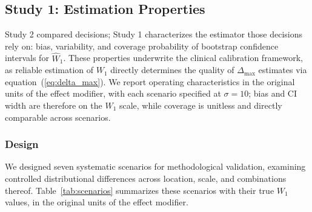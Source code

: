 \documentclass[AMA,Times1COL]{WileyNJDv5}
\begin{document}

\subsection{Study 1: Estimation Properties}\label{sec:study1}

Study 2 compared decisions; Study 1 characterizes the estimator those decisions rely on: bias, variability, and coverage probability of bootstrap confidence intervals for $\widehat{W}_1$. These properties underwrite the clinical calibration framework, as reliable estimation of $W_1$ directly determines the quality of $\Delta_{\max}$ estimates via equation~(\ref{eq:delta_max}). We report operating characteristics in the original units of the effect modifier, with each scenario specified at $\sigma = 10$; bias and CI width are therefore on the $W_1$ scale, while coverage is unitless and directly comparable across scenarios.

\subsubsection{Design}\label{sec:sim_design}

We designed seven systematic scenarios for methodological validation, examining controlled distributional differences across location, scale, and combinations thereof. Table~\ref{tab:scenarios} summarizes these scenarios with their true $W_1$ values, in the original units of the effect modifier.
\end{document}
